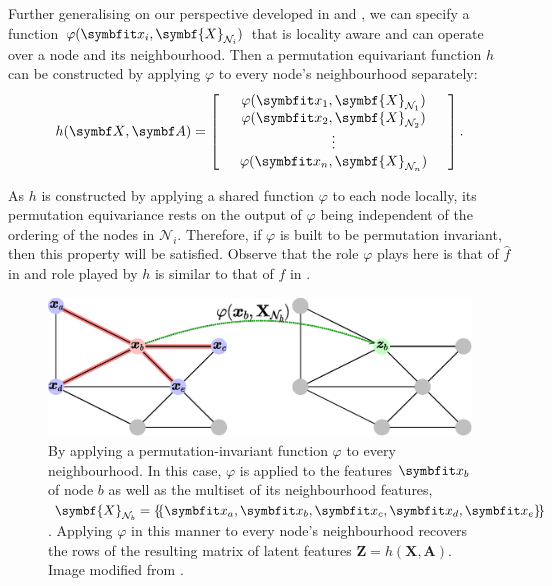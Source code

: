 Further generalising on our perspective developed in  and , we can specify a function $\varphi(\bfitx_i, \symbf{X}_{\mathcal{N}_{i}})$ that is locality aware and can operate over a node and its neighbourhood. Then a permutation equivariant function $h$ can be constructed by applying $\varphi$ to every node's neighbourhood separately:
\begin{equation}
    h({\symbf X}, {\symbf A}) =
\left[
  \begin{array}{ccc}
     & \varphi(\bfitx_1, \symbf{X}_{\mathcal{N}_1}) &  \\
     & \varphi(\bfitx_2, \symbf{X}_{\mathcal{N}_2}) &  \\
             & \vdots    &          \\
     & \varphi(\bfitx_n, \symbf{X}_{\mathcal{N}_n}) & 
  \end{array}
\right].
\label{eq:graph_equivariant}
\end{equation}

As $h$ is constructed by applying a shared function $\varphi$ to each node locally, its permutation equivariance rests on the output of $\varphi$ being independent of the ordering of the nodes in $\mathcal{N}_i$. Therefore, if $\varphi$ is built to be permutation invariant, then this property will be satisfied. Observe that the role $\varphi$ plays here is that of $\widehat{f}$ in  and role played by $h$ is similar to that of $f$ in .

\begin{figure}[th]
    \centering
    \includegraphics[width=\linewidth]{chapters/assets/graph-figs/GC_GDL.eps}
    \caption{By applying a permutation-invariant function $\varphi$ to every neighbourhood. In this case, $\varphi$ is applied to the features $\bfitx_b$ of node $b$ as well as the multiset  of its neighbourhood features, $\symbf{X}_{\mathcal{N}_b} = \ldblbrace\bfitx_a, \bfitx_b, \bfitx_c, \bfitx_d, \bfitx_e\rdblbrace$. Applying $\varphi$ in this manner to every node's neighbourhood recovers the rows of the resulting matrix of latent features $\symbf{Z}=h(\symbf{X}, \symbf{A})$. Image modified from \parencite{Bronstein2021}.}
    \label{fig:gc_gdl}
\end{figure}%

